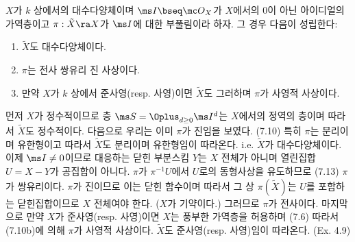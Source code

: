 	
	\begin{proposition}
	$X$가 $k$ 상에서의 대수다양체이며 $\ms I\bseq\mc O_X$가 $X$에서의 0이 아닌 아이디얼의 가역층이고
	$\pi:\tilde X\ra X$가 $\ms I$에 대한 부풀림이라 하자. 그 경우 다음이 성립한다:
	\begin{enumerate}[label=(\alph*)]
	\item $\tilde X$도 대수다양체이다.
	\item $\pi$는 전사 쌍유리 진 사상이다.
	\item 만약 $X$가 $k$ 상에서 준사영(resp. 사영)이면 $\tilde X$도 그러하며 $\pi$가 사영적 사상이다.\\
	\end{enumerate}
	\pf 먼저 $X$가 정수적이므로 층 $\ms S=\Oplus_{d\ge 0}\ms I^d$는 $X$에서의 정역의 층이며 따라서 $\tilde X$도 정수적이다.
	다음으로 우리는 이미 $\pi$가 진임을 보였다. (7.10)
	특히 $\pi$는 분리이며 유한형이고 따라서 $\tilde X$도 분리이며 유한형임이 따라온다. i.e. $\tilde X$가 대수다양체이다.
	이제 $\ms I\ne 0$이므로 대응하는 닫힌 부분스킴 $Y$는 $X$ 전체가 아니며 열린집합 $U=X-Y$가 공집합이 아니다.
	$\pi$가 $\pi^{-1}U$에서 $U$로의 동형사상을 유도하므로 (7.13) $\pi$가 쌍유리이다.
	$\pi$가 진이므로 이는 닫힌 함수이며 따라서 그 상 $\pi(\tilde X)$는 $U$를 포함하는 닫힌집합이므로 $X$ 전체여야 한다.
	($X$가 기약이다.) 그러므로 $\pi$가 전사이다.
	마지막으로 만약 $X$가 준사영(resp. 사영)이면 $X$는 풍부한 가역층을 허용하며 (7.6)
	따라서 (7.10b)에 의해 $\pi$가 사영적 사상이다. $\tilde X$도 준사영(resp. 사영)임이 따라온다. (Ex. 4.9)
	\end{proposition}
	
